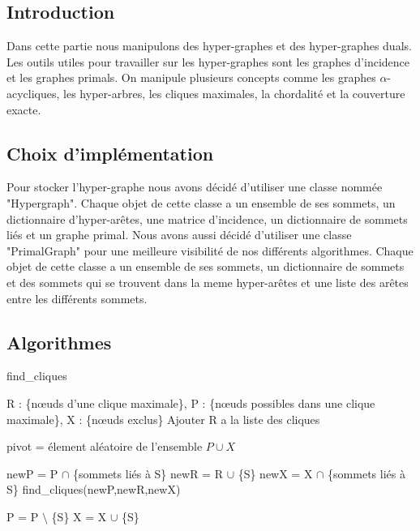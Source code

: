 \documentclass{article}
\begin{document}
	\subsection{Introduction}
	Dans cette partie nous manipulons des hyper-graphes et des hyper-graphes duals. Les outils utiles pour travailler sur les hyper-graphes sont les graphes d’incidence et les graphes primals. On manipule plusieurs concepts comme les graphes $\alpha$-acycliques, les hyper-arbres, les cliques maximales, la chordalité et la couverture exacte.
	
	\subsection{Choix d'implémentation}
	Pour stocker l'hyper-graphe nous avons décidé d'utiliser une classe nommée "Hypergraph". Chaque objet de cette classe a un ensemble de ses sommets, un dictionnaire d'hyper-arêtes, une matrice d'incidence, un dictionnaire de sommets liés et un graphe primal.
	Nous avons aussi décidé d'utiliser une classe "PrimalGraph" pour une meilleure visibilité de nos différents algorithmes. Chaque objet de cette classe a un ensemble de ses sommets, un dictionnaire de sommets et des sommets qui se trouvent dans la meme hyper-arêtes  et une liste des arêtes entre les différents sommets.
	
	\subsection{Algorithmes}
	
		\begin{algorithm}[H]
		\caption{find\_cliques}
		\begin{algorithmic}[1]
		\REQUIRE R : \{nœuds d'une clique maximale\}, P : \{nœuds possibles dans une clique maximale\}, X : \{nœuds exclus\}
		\STATE Ajouter R a la liste des cliques
		\ENDIF
		
		\ELSE
		
		\STATE pivot = élement aléatoire de l'ensemble $P \cup X $
		
		
		\STATE newP = P $\cap$ \{sommets liés à S\}
		\STATE newR = R $\cup$ \{S\}
		\STATE newX = X $\cap$ \{sommets liés à S\}
		\STATE find\_cliques(newP,newR,newX)
		
		\STATE P = P $\setminus$ \{S\}
		\STATE X = X $\cup$ \{S\}
		\ENDFOR		
		
		\ENDIF
	
	
		\end{algorithmic}
		\end{algorithm}
\end{document}
